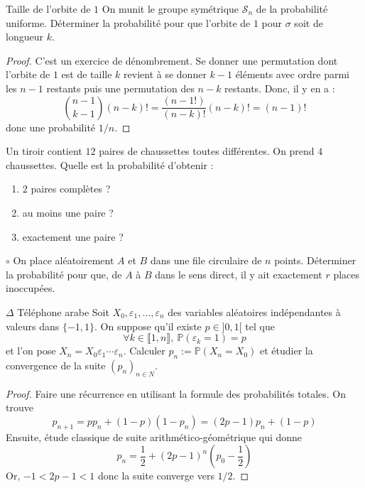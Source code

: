 \documentclass[french,a4paper]{article}
\renewcommand{\P}{\mathbb{P}}
\theoremstyle{plain}
\theoremstyle{definition}
\theoremstyle{remark}
\begin{document}
\begin{ex}[Moulin.05]{Taille de l'orbite de $1$}
	On munit le groupe symétrique $\mathcal{S}_n$ de la probabilité uniforme. Déterminer la probabilité pour que l'orbite de $1$ pour $\sigma$ soit de longueur $k$.
\end{ex}
\begin{proof}
	C'est un exercice de dénombrement. Se donner une permutation dont l'orbite de $1$ est de taille $k$ revient à se donner $k-1$ éléments avec ordre parmi les $n-1$ restants puis une permutation des $n-k$ restants. Donc, il y en a : $$\binom{n-1}{k-1}(n-k)!=\frac{(n-1!)}{(n-k)!}(n-k)!=(n-1)!$$ donc une probabilité $1/n$.
\end{proof}

\begin{ex}[Moulin.06]{}
	Un tiroir contient $12$ paires de chaussettes toutes différentes. On prend $4$ chaussettes. Quelle est la probabilité d'obtenir :
	\begin{enumerate}
		\item $2$ paires complètes ?
		\item au moins une paire ?
		\item exactement une paire ?
	\end{enumerate}
\end{ex}

\begin{ex}[Moulin.07]{$\circ$}
	On place aléatoirement $A$ et $B$ dans une file circulaire de $n$ points. Déterminer la probabilité pour que, de $A$ à $B$ dans le sens direct, il y ait exactement $r$ places inoccupées.
\end{ex}

\begin{ex}[Moulin.08]{$\Delta$ Téléphone arabe}
	Soit $X_0,\varepsilon_1,\ldots,\varepsilon_n$ des variables aléatoires indépendantes à valeurs dans $\{-1,1\}$. On suppose qu'il existe $p\in]0,1[$ tel que $$\forall k\in\llbracket1,n\rrbracket,\ \P(\varepsilon_k=1)=p$$ et l'on pose $X_n=X_0\varepsilon_1\cdots\varepsilon_n$. Calculer $p_n:=\P(X_n=X_0)$ et étudier la convergence de la suite $(p_n)_{n\in N}$.
\end{ex}
\begin{proof}
	Faire une récurrence en utilisant la formule des probabilités totales. On trouve $$p_{n+1}=pp_n+(1-p)(1-p_n)=(2p-1)p_n+(1-p)$$ Ensuite, étude classique de suite arithmético-géométrique qui donne $$p_n=\frac{1}{2}+(2p-1)^n\left(p_0-\frac{1}{2}\right)$$ Or, $-1<2p-1<1$ donc la suite converge vers $1/2$.
\end{proof}
\end{document}
